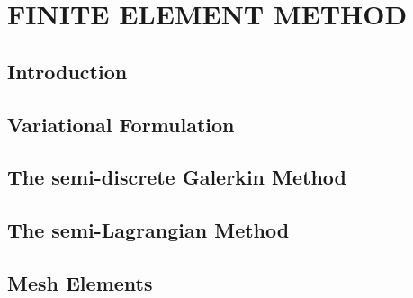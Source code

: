 \chapter{\textbf{FINITE ELEMENT METHOD}}
\label{metodo dos elementos finitos}

\section{\textbf{Introduction}} 


\section{\textbf{Variational Formulation}} 
\label{formulacao variacional}



\section{\textbf{The semi-discrete Galerkin Method}} 
\label{discretizacao espaco}



\section{\textbf{The semi-Lagrangian Method}} 
\label{discretizacao tempo}



\section{\textbf{Mesh Elements}} 
\label{elemento}





